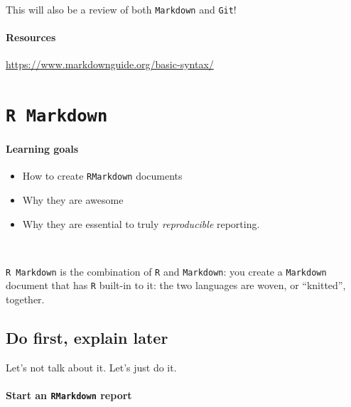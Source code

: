 \documentclass[
]{book}
\providecommand{\tightlist}{%
  \setlength{\itemsep}{0pt}\setlength{\parskip}{0pt}}
\begin{document}
This will also be a review of both \texttt{Markdown} and \texttt{Git}!

\hypertarget{resources}{%
\subsubsection*{Resources}\label{resources}}

\url{https://www.markdownguide.org/basic-syntax/}

\hypertarget{r-markdown}{%
\chapter{\texorpdfstring{\texttt{R\ Markdown}}{R Markdown}}\label{r-markdown}}

\hypertarget{learning-goals-11}{%
\subsubsection*{Learning goals}\label{learning-goals-11}}

\begin{itemize}
\tightlist
\item
  How to create \texttt{RMarkdown} documents\\
\item
  Why they are awesome\\
\item
  Why they are essential to truly \emph{reproducible} reporting.
\end{itemize}

~

\texttt{R\ Markdown} is the combination of \texttt{R} and \texttt{Markdown}: you create a \texttt{Markdown} document that has \texttt{R} built-in to it: the two languages are woven, or ``knitted'', together.

\hypertarget{do-first-explain-later}{%
\section*{Do first, explain later}\label{do-first-explain-later}}

Let's not talk about it. Let's just do it.

\hypertarget{start-an-rmarkdown-report}{%
\subsubsection*{\texorpdfstring{Start an \texttt{RMarkdown} report}{Start an RMarkdown report}}\label{start-an-rmarkdown-report}}
\end{document}
